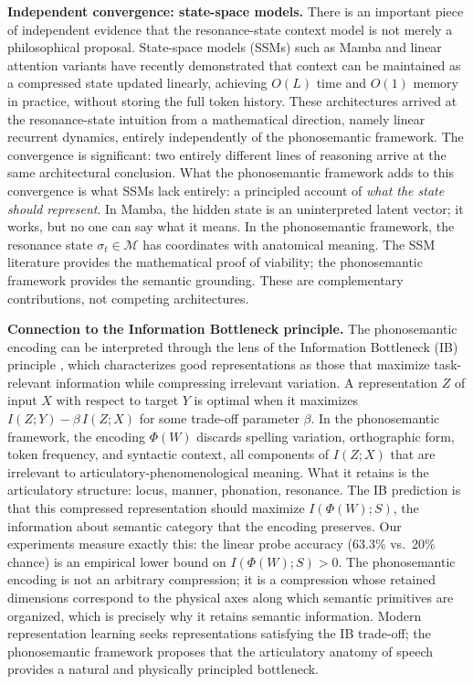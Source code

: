 \documentclass[12pt]{article}
\begin{document}
\textbf{Independent convergence: state-space models.} There is an important piece of independent evidence that the resonance-state context model is not merely a philosophical proposal. State-space models (SSMs) such as Mamba \citep{gu2022mamba} and linear attention variants \citep{katharopoulos2020} have recently demonstrated that context can be maintained as a compressed state updated linearly, achieving $O(L)$ time and $O(1)$ memory in practice, without storing the full token history. These architectures arrived at the resonance-state intuition from a mathematical direction, namely linear recurrent dynamics, entirely independently of the phonosemantic framework. The convergence is significant: two entirely different lines of reasoning arrive at the same architectural conclusion. What the phonosemantic framework adds to this convergence is what SSMs lack entirely: a principled account of \textit{what the state should represent}. In Mamba, the hidden state is an uninterpreted latent vector; it works, but no one can say what it means. In the phonosemantic framework, the resonance state $\sigma_t \in \mathcal{M}$ has coordinates with anatomical meaning. The SSM literature provides the mathematical proof of viability; the phonosemantic framework provides the semantic grounding. These are complementary contributions, not competing architectures.

\textbf{Connection to the Information Bottleneck principle.} The phonosemantic encoding can be interpreted through the lens of the Information Bottleneck (IB) principle \citep{tishby2000}, which characterizes good representations as those that maximize task-relevant information while compressing irrelevant variation. A representation $Z$ of input $X$ with respect to target $Y$ is optimal when it maximizes $I(Z;Y) - \beta\, I(Z;X)$ for some trade-off parameter $\beta$. In the phonosemantic framework, the encoding $\Phi(W)$ discards spelling variation, orthographic form, token frequency, and syntactic context, all components of $I(Z;X)$ that are irrelevant to articulatory-phenomenological meaning. What it retains is the articulatory structure: locus, manner, phonation, resonance. The IB prediction is that this compressed representation should maximize $I(\Phi(W); S)$, the information about semantic category that the encoding preserves. Our experiments measure exactly this: the linear probe accuracy (63.3\% vs.~20\% chance) is an empirical lower bound on $I(\Phi(W); S) > 0$. The phonosemantic encoding is not an arbitrary compression; it is a compression whose retained dimensions correspond to the physical axes along which semantic primitives are organized, which is precisely why it retains semantic information. Modern representation learning seeks representations satisfying the IB trade-off; the phonosemantic framework proposes that the articulatory anatomy of speech provides a natural and physically principled bottleneck.
\end{document}
